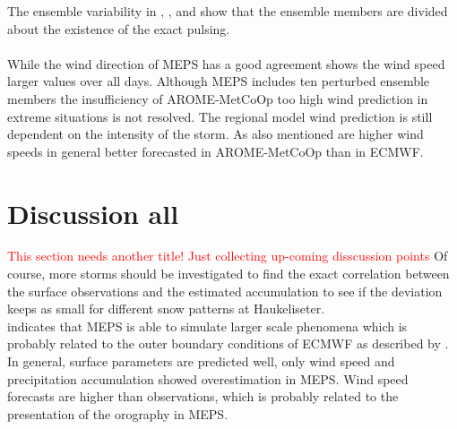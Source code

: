 The ensemble variability in , , and  show that the ensemble members are divided about the existence of the exact pulsing. 
\\
\\
While the wind direction of MEPS has a good agreement shows the wind speed larger values over all days. Although MEPS includes ten perturbed ensemble members the insufficiency of AROME-MetCoOp too high wind prediction in extreme situations is not resolved. The regional model wind prediction is still dependent on the intensity of the storm. As \cite{muller_arome-metcoop:_2017} also mentioned are higher wind speeds in general better forecasted in AROME-MetCoOp than in ECMWF. 
\section{Discussion all}
\textcolor{red}{This section needs another title! Just collecting up-coming disscussion points}
Of course, more storms should be investigated to find the exact correlation between the surface observations and the estimated accumulation to see if the deviation keeps as small for different snow patterns at Haukeliseter. 
\\
 indicates that MEPS is able to simulate larger scale phenomena which is probably related to the outer boundary conditions of ECMWF as described by \citet{dahlgren_comparison_2013}.
In general, surface parameters are predicted well, only wind speed and precipitation accumulation showed overestimation in MEPS. Wind speed forecasts are higher than observations, which is probably related to the presentation of the orography in MEPS.
